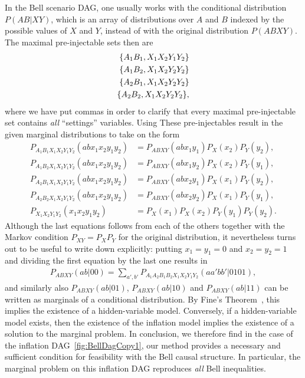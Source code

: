 In the Bell scenario DAG, one usually works with the conditional distribution $P(AB|XY)$, which is an array of distributions over $A$ and $B$ indexed by the possible values of $X$ and $Y$, instead of with the original distribution $P(ABXY)$. The maximal pre-injectable sets then are
\begin{align*}
\brackets{A_1 B_1, X_1 X_2 Y_1 Y_2} \\
\brackets{A_1 B_2, X_1 X_2 Y_2 Y_2} \\
\brackets{A_2 B_1, X_1 X_2 Y_2 Y_2} \\
\brackets{A_2 B_2, X_1 X_2 Y_2 Y_2} ,
\end{align*}
where we have put commas in order to clarify that every maximal pre-injectable set contains \emph{all} ``settings'' variables. Using These pre-injectables result in the given marginal distributions to take on the form
\begin{align*}
	P_{A_1 B_1 X_1 X_2 Y_1 Y_2}(a b x_1 x_2 y_1 y_2) & = P_{A B X Y}(a b x_1 y_1) P_X(x_2) P_Y(y_2), \\
	P_{A_1 B_2 X_1 X_2 Y_1 Y_2}(a b x_1 x_2 y_1 y_2) & = P_{A B X Y}(a b x_1 y_2) P_X(x_2) P_Y(y_1), \\
	P_{A_2 B_1 X_1 X_2 Y_1 Y_2}(a b x_1 x_2 y_1 y_2) & = P_{A B X Y}(a b x_2 y_1) P_X(x_1) P_Y(y_2), \\
	P_{A_2 B_2 X_1 X_2 Y_1 Y_2}(a b x_1 x_2 y_1 y_2) & = P_{A B X Y}(a b x_2 y_2) P_X(x_1) P_Y(y_1), \\
		P_{X_1 X_2 Y_1 Y_2}(x_1 x_2 y_1 y_2) & = P_X(x_1) P_X(x_2) P_Y(y_1) P_Y(y_2).
\end{align*}
Although the last equations follows from each of the others together with the Markov condition $P_{XY} = P_X P_Y$ for the original distribution, it nevertheless turns out to be useful to write down explicitly: putting $x_1 = y_1 = 0$ and $x_2 = y_2 = 1$ and dividing the first equation by the last one results in
\begin{align*}
	P_{A B X Y}(a b | 0 0)  =  \sum_{a',b'} P_{A_1 A_2 B_1 B_2 X_1 X_2 Y_1 Y_2}(aa'bb'|0101),
\end{align*}
and similarly also $P_{A B X Y}(a b | 0 1)$, $P_{A B X Y}(a b | 1 0)$ and $P_{A B X Y}(a b | 1 1)$ can be written as marginals of a conditional distribution. By Fine's Theorem~\cite{FineTheorem}, this implies the existence of a hidden-variable model. Conversely, if a hidden-variable model exists, then the existence of the inflation model implies the existence of a solution to the marginal problem. In conclusion, we therefore find in the case of the inflation DAG~\cref{fig:BellDagCopy1}, our method provides a necessary and sufficient condition for feasibility with the Bell causal structure. In particular, the marginal problem on this inflation DAG reproduces \emph{all} Bell inequalities.


